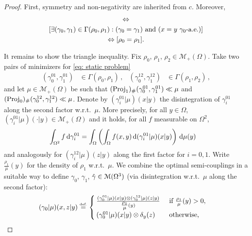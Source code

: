 \begin{proof}
First, symmetry and non-negativity are inherited from $c$. Moreover, 
\begin{multline*}
[ C_K(\gamma_0,\gamma_1) = 0 ]
\Leftrightarrow \\
[ \exists (\gamma_0, \gamma_1) \in \Gamma(\rho_0, \rho_1) : (\gamma_0= \gamma_1) \tn{ and }  (x=y \tn{ $\gamma_0$-a.e.}) ] \\
\Leftrightarrow
[ \rho_0 = \rho_1 ].
\end{multline*}

\newcommand{\mudens}[1]{{\textstyle{\frac{#1}{\mu}}}}
\newcommand{\mudisint}[1]{{(#1|\mu)}}
It remains to show the triangle inequality. Fix $\rho_0$, $\rho_1$, $\rho_2 \in \mathcal{M}_+(\Omega)$. Take two pairs of minimizers for \eqref{eq: static problem} 
	\begin{align*}
		(\gamma_0^{01},\gamma_1^{01}) & \in \Gamma(\rho_0,\rho_1)\,, &
		(\gamma_0^{12},\gamma_1^{12}) & \in \Gamma(\rho_1,\rho_2)\,, 		
	\end{align*}
and let $\mu \in \mathcal{M}_+(\Omega)$ be such that $(\operatorname{Proj}_1)_{\#} (\gamma_0^{01},\gamma_1^{01}) \ll \mu$ and $(\operatorname{Proj}_0)_{\#} (\gamma_0^{12},\gamma_1^{12}) \ll \mu $. Denote by $\mudisint{\gamma_i^{01}}(x|y)$ the disintegration of $\gamma_i^{01}$ along the second factor w.r.t.\ $\mu$. More precisely, for all $y\in \Omega$, $\mudisint{\gamma_i^{01}}(\cdot|y)\in \mathcal{M}_+(\Omega)$ and it holds, for all $f$ measurable on $\Omega^2$, 
\begin{align*}
	\int_{\Omega^2} f\,\d\gamma_i^{01} & = \int_{\Omega} \left( \int_{\Omega} f(x,y)\,\d\mudisint{\gamma_i^{01}}(x|y) \right)\,\d\mu(y)
\end{align*}
and analogously for $\mudisint{\gamma_i^{12}}(z|y)$ along the first factor for $i=0,1$. Write $\mudens{\rho_1}(y)$ for the density of $\rho_1$ w.r.t.\ $\mu$.
%
We combine the optimal semi-couplings in a suitable way to define $\gamma_0$, $\gamma_1$, $\hat{\gamma} \in \mathcal{M}(\Omega^3)$ (via disintegration w.r.t.\ $\mu$ along the second factor):
\begin{align*}
\mudisint{\gamma_0}(x,z|y) &\eqdef
\begin{cases}
\frac{\mudisint{\gamma_0^{01}}(x|y) \otimes \mudisint{\gamma_0^{12}}(z|y)}{\mudens{\rho_1}(y)} & \tn{ if } \mudens{\rho_1}(y) >0, \\
\mudisint{\gamma_0^{01}}(x|y) \otimes \delta_{y}(z) & \tn{ otherwise, }

\end{cases}
\end{align*}
\end{proof}
